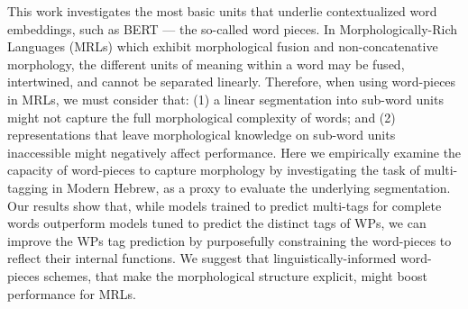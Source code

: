 This work investigates the most basic units that underlie contextualized word embeddings, such as BERT --- the so-called word pieces. In Morphologically-Rich Languages (MRLs) which exhibit morphological fusion and  non-concatenative morphology, the different units of meaning within a word may be fused,  intertwined, and cannot be separated linearly. Therefore, when using word-pieces in MRLs, we must consider that: (1) a linear segmentation into sub-word units might not capture the full morphological complexity of words; and (2)  representations that leave morphological knowledge on sub-word units inaccessible might negatively affect performance. Here we empirically examine the capacity of word-pieces to capture morphology by investigating the task of multi-tagging in Modern Hebrew, as a proxy to evaluate the underlying segmentation. Our results show that, while models trained to predict multi-tags for complete words  outperform models tuned to predict the distinct tags of  WPs, we can improve the WPs tag prediction by purposefully constraining the word-pieces to reflect their internal functions.  We suggest that linguistically-informed word-pieces schemes, that make  the morphological structure explicit, might boost performance for MRLs.
